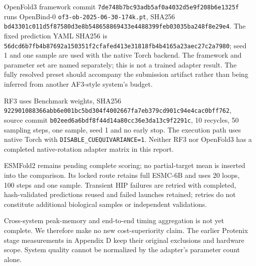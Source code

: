 OpenFold3 framework commit \nolinkurl{7de748b7bc93adb5af0a4032d5e9f208b6e1325f} runs
OpenBind-0 \nolinkurl{of3-ob-2025-06-30-174k.pt}, SHA256
\nolinkurl{bd43301c011d5f87580d3e8b548658869433e4488399feb03035ba248f8e29e4}.
The fixed prediction YAML SHA256 is
\nolinkurl{56dcd6b7fb4b87692a150351f2cfafed413e31818fb4b4165a23aec27c2a7980};
seed 1 and one sample are used with the native Torch backend. The framework
and parameter set are named separately; this is not a trained adapter result.
The fully resolved preset should accompany the submission artifact rather than
being inferred from another AF3-style system's budget.

RF3 uses Benchmark weights, SHA256
\nolinkurl{922901088366abb6e001bc5bd304f4002667fa7eb379cd901c94e4cac0bff762},
source commit \nolinkurl{b02eed6a6bdf8f44d14a80cc36e3da13c9f2291c}, 10 recycles,
50 sampling steps, one sample, seed 1 and no early stop. The execution path uses
native Torch with \nolinkurl{DISABLE_CUEQUIVARIANCE=1}. Neither RF3 nor OpenFold3 has a
completed native-rotation adapter matrix in this report.

ESMFold2 remains pending complete scoring; no partial-target mean is inserted
into the comparison. Its locked route retains full ESMC-6B and uses 20 loops,
100 steps and one sample. Transient HIP failures are retried with completed,
hash-validated predictions reused and failed launches retained; retries do not
constitute additional biological samples or independent validations.

Cross-system peak-memory and end-to-end timing aggregation is not yet complete.
We therefore make no new cost-superiority claim. The earlier Protenix stage
measurements in Appendix D keep their original exclusions and hardware scope.
System quality cannot be normalized by the adapter's parameter count alone.

